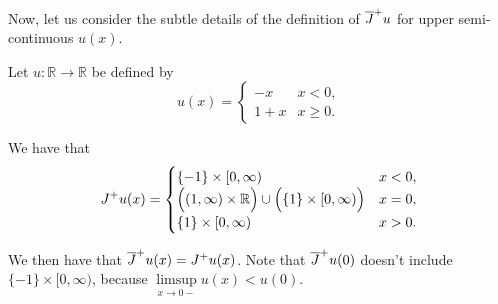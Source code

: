 Now, let us consider the subtle details of the definition of $\overline{J}^+ u$ for upper semi-continuous $u(x)$.

\begin{example}
Let $u: \mathbb R\to \mathbb R$ be defined by 
\begin{equation}
u(x) = \begin{cases}
-x & x<0,\\
1+x & x\geq 0.
\end{cases}
\end{equation}

We have that 
\begin{equation}
J^+ u (x) = \begin{cases}
\{-1\}\times [0,\infty) & x<0,\\
\Big( (1,\infty)\times \mathbb R\Big)\cup \Big(\{1\}\times [0,\infty)\Big) & x=0,\\
\{1\}\times[0,\infty)& x>0.
\end{cases}
\end{equation}

We then have that $\overline{J}^+ u(x) = J^+ u(x)$. Note that $\overline{J}^+ u(0)$ doesn't include $\{-1\}\times[0,\infty)$, because $\limsup\limits_{x\to 0-} u(x) < u(0).$
\end{example}